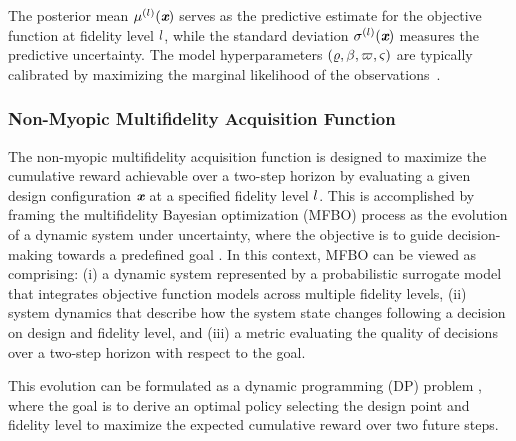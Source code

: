 The posterior mean $\mu^{(l)}(\textbf{\em x})$ serves as the predictive estimate for the objective function at fidelity level $l$, while the standard deviation $\sigma^{(l)}(\textbf{\em x})$ measures the predictive uncertainty. The model hyperparameters $(\varrho, \beta, \varpi, \varsigma)$ are typically calibrated by maximizing the marginal likelihood of the observations~\cite{ForresterAl2008}.

\subsubsection{Non-Myopic Multifidelity Acquisition Function}
\label{s:NMAF}

The non-myopic multifidelity acquisition function is designed to maximize the cumulative reward achievable over a two-step horizon by evaluating a given design configuration \(\textbf{\em x}\) at a specified fidelity level \(l\). This is accomplished by framing the multifidelity Bayesian optimization (MFBO) process as the evolution of a dynamic system under uncertainty, where the objective is to guide decision-making towards a predefined goal \cite{DiFioreMaininiNM2BO}. In this context, MFBO can be viewed as comprising: (i) a dynamic system represented by a probabilistic surrogate model that integrates objective function models across multiple fidelity levels, (ii) system dynamics that describe how the system state changes following a decision on design and fidelity level, and (iii) a metric evaluating the quality of decisions over a two-step horizon with respect to the goal.

This evolution can be formulated as a dynamic programming (DP) problem \cite{Bertsekas1995, Powell2007}, where the goal is to derive an optimal policy selecting the design point and fidelity level to maximize the expected cumulative reward over two future steps.

